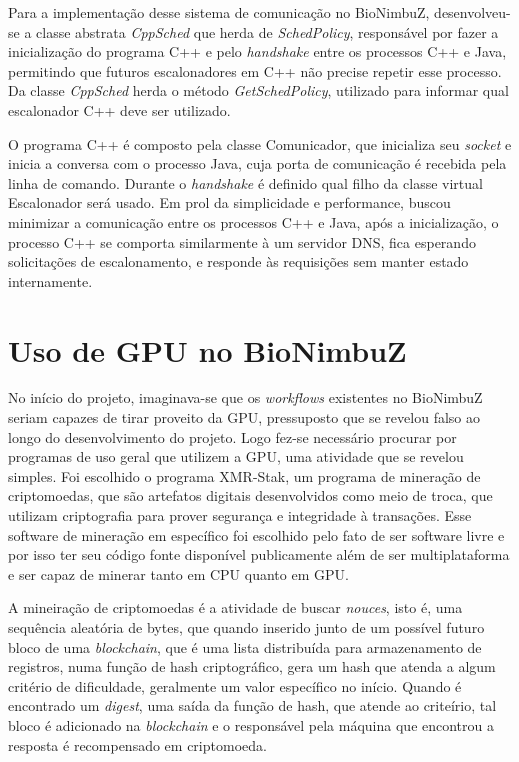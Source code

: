 Para a implementação desse sistema de comunicação no BioNimbuZ, desenvolveu-se a classe abstrata \textit{CppSched} que herda de \textit{SchedPolicy}, responsável por fazer a inicialização do programa C++ e pelo \textit{handshake} entre os processos C++ e Java, permitindo que futuros escalonadores em C++ não precise repetir esse processo. Da classe \textit{CppSched} herda o método \textit{GetSchedPolicy}, utilizado para informar qual escalonador C++ deve ser utilizado.

O programa C++ é composto pela classe Comunicador, que inicializa seu \textit{socket} e inicia a conversa com o processo Java, cuja porta de comunicação é recebida pela linha de comando. Durante o \textit{handshake} é definido qual filho da classe virtual Escalonador será usado. Em prol da simplicidade e performance, buscou minimizar a comunicação entre os processos C++ e Java, após a inicialização, o processo C++ se comporta similarmente à um servidor \acrshort{DNS}\cite{dns_rfc}, fica esperando solicitações de escalonamento, e responde às requisições sem manter estado internamente.

\section{Uso de \acrshort{GPU} no BioNimbuZ}

No início do projeto, imaginava-se que os \textit{workflows} existentes no BioNimbuZ seriam capazes de tirar proveito da \acrshort{GPU}, pressuposto que se revelou falso ao longo do desenvolvimento do projeto. Logo fez-se necessário procurar por programas de uso geral que utilizem a \acrshort{GPU}, uma atividade que se revelou simples. Foi escolhido o programa XMR-Stak\cite{xmr_stak}, um programa de mineração de criptomoedas, que são artefatos digitais desenvolvidos como meio de troca, que utilizam criptografia para prover segurança e integridade à transações\cite{crypto_currencies}. Esse software de mineração em específico foi escolhido pelo fato de ser software livre e por isso ter seu código fonte disponível publicamente além de ser multiplataforma e ser capaz de minerar tanto em CPU quanto em GPU.

A mineiração de criptomoedas é a atividade de buscar \textit{nouces}, isto é, uma sequência aleatória de bytes, que quando inserido junto de um possível futuro bloco de uma \textit{blockchain}, que é uma lista distribuída para armazenamento de registros, numa função de hash criptográfico, gera um hash que atenda a algum critério de dificuldade, geralmente um valor específico no início. Quando é encontrado um \textit{digest}, uma saída da função de hash, que atende ao criteírio, tal bloco é adicionado na \textit{blockchain} e o responsável pela máquina que encontrou a resposta é recompensado em criptomoeda.



 


